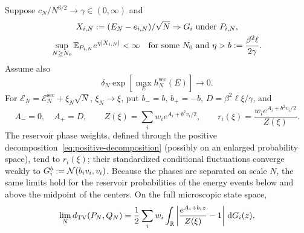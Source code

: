 \begin{theorem}
\label{thm:physical-boundary}
Suppose $c_N/N^{3/2}\to\gamma\in(0,\infty)$ and
\begin{equation}
 \begin{gathered}
 X_{i,N}:=(E_N-e_{i,N})/\sqrt N\Rightarrow G_i
 \ \text{under }P_{i,N},\\
 \sup_{N\ge N_0}\mathbb E_{P_{i,N}}e^{\eta|X_{i,N}|}<\infty
 \quad\text{for some }N_0\text{ and }\eta>b:=\frac{\beta^2\ell}{2\gamma}.
 \end{gathered}
 \label{eq:boundary-moment}
\end{equation}
Assume also
\begin{equation}
 \delta_N\exp\!\left[\max_E h_N^{\mathrm{sec}}(E)\right]\longrightarrow0.
 \label{eq:boundary-exception}
\end{equation}
For $\mathcal E_N=\mathcal E_N^{\mathrm{sec}}+\xi_N\sqrt N$, $\xi_N\to\xi$,
put $b_-=b$, $b_+=-b$, $D=\beta^2\ell\xi/\gamma$, and
\begin{equation}
 A_-=0,\quad A_+=D,\qquad
 Z(\xi)=\sum_iw_i e^{A_i+b^2v_i/2},\qquad
 r_i(\xi)=\frac{w_i e^{A_i+b^2v_i/2}}{Z(\xi)}.
 \label{eq:boundary-phase-weights}
\end{equation}
The reservoir phase weights, defined through the positive
decomposition~\eqref{eq:positive-decomposition} (possibly on an
enlarged probability space), tend to $r_i(\xi)$; their standardized
conditional fluctuations converge weakly to
$G_i^b:=\mathcal N(b_iv_i,v_i)$. Because the phases are separated on
scale $N$, the same limits hold for the reservoir probabilities of the
energy events below and above the midpoint of the centers. On the full
microscopic state space,
\begin{equation}
 \lim_Nd_{\mathrm{TV}}(P_N,Q_N)
 =\frac12\sum_iw_i\int_{\mathbb R}
 \left|\frac{e^{A_i+b_i z}}{Z(\xi)}-1\right|\,\mathrm d G_i(z).
 \label{eq:physical-boundary-tv}
\end{equation}
\end{theorem}

